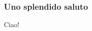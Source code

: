 \documentclass{beamer}
\begin{document}
 \begin{frame}
  \frametitle{Uno splendido saluto}
  Ciao!
 \end{frame} %
\end{document}
